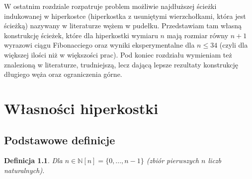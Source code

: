\documentclass{pracamgr}
\newtheorem{defi}[theorem]{Definicja}
\begin{document}
  W ostatnim rozdziale rozpatruje problem możliwie najdłuższej ścieżki indukowanej w hiperkostce (hiperkostka z usuniętymi wierzchołkami, która jest ścieżką)
  nazywany w literaturze wężem w pudełku. Przedstawiam tam własną konstrukcję ścieżek, które dla hiperkostki wymiaru $n$ mają rozmiar równy $n+1$
  wyrazowi ciągu Fibonacciego oraz wyniki eksperymentalne dla $n\le34$ (czyli dla większej ilości niż w większości prac).
  Pod koniec rozdziału wymieniam też znalezioną w literaturze, trudniejszą, lecz dającą lepsze rezultaty konstrukcję długiego węża oraz
  ograniczenia górne.

  
  
 \chapter{Własności hiperkostki}
  \section{Podstawowe definicje}
   \begin{defi}\label{[n]}
    Dla $n\in\mathbb{N}$\quad $[n]=\{0,...,n-1\}$ (zbiór pierwszych $n$ liczb naturalnych).
   \end{defi}
\end{document}
